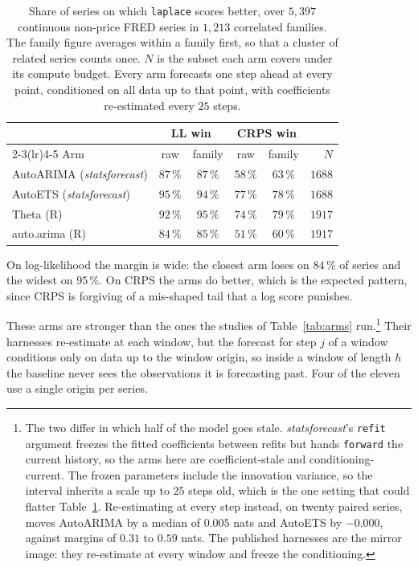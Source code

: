 \documentclass[article]{jss}
\providecommand{\proglang}[1]{\textsf{#1}}
\providecommand{\pkg}[1]{\textit{#1}}
\renewcommand{\pkg}[1]{\textit{#1}}
\providecommand{\code}[1]{\texttt{#1}}
\begin{document}
\begin{table}[t!]
\centering
\begin{tabular}{lccccr}
\toprule
 & \multicolumn{2}{c}{LL win} & \multicolumn{2}{c}{CRPS win} & \\
\cmidrule(lr){2-3}\cmidrule(lr){4-5}
Arm & raw & family & raw & family & $N$ \\
\midrule
AutoARIMA (\pkg{statsforecast}) & $87\,\%$ & $87\,\%$ & $58\,\%$ & $63\,\%$ & $1688$ \\
AutoETS (\pkg{statsforecast})   & $95\,\%$ & $94\,\%$ & $77\,\%$ & $78\,\%$ & $1688$ \\
Theta (\proglang{R})            & $92\,\%$ & $95\,\%$ & $74\,\%$ & $79\,\%$ & $1917$ \\
auto.arima (\proglang{R})       & $84\,\%$ & $85\,\%$ & $51\,\%$ & $60\,\%$ & $1917$ \\
\bottomrule
\end{tabular}
\caption{Share of series on which \code{laplace} scores better, over $5{,}397$
continuous non-price \proglang{FRED} series in $1{,}213$ correlated families.
The family figure averages within a family first, so that a cluster of related
series counts once. $N$ is the subset each arm covers under its compute budget.
Every arm forecasts one step ahead at every point, conditioned on all data up to
that point, with coefficients re-estimated every $25$ steps.}
\label{tab:classic}
\end{table}

On log-likelihood the margin is wide: the closest arm loses on $84\,\%$ of
series and the widest on $95\,\%$. On CRPS the arms do better, which is the
expected pattern, since CRPS is forgiving of a mis-shaped tail that a log score
punishes.

These arms are stronger than the ones the studies of Table~\ref{tab:arms}
run.\footnote{The two differ in which half of the model goes stale.
\pkg{statsforecast}'s \code{refit} argument freezes the fitted coefficients
between refits but hands \code{forward} the current history, so the arms here
are coefficient-stale and conditioning-current. The frozen parameters include
the innovation variance, so the interval inherits a scale up to $25$ steps old,
which is the one setting that could flatter Table~\ref{tab:classic}.
Re-estimating at every step instead, on twenty paired series, moves AutoARIMA by
a median of $0.005$ nats and AutoETS by $-0.000$, against margins of $0.31$ to
$0.59$ nats. The published harnesses are the mirror image: they re-estimate at
every window and freeze the conditioning.} Their harnesses re-estimate at each
window, but the forecast for step $j$ of a window conditions only on data up to
the window origin, so inside a window of length $h$ the baseline never sees the
observations it is forecasting past. Four of the eleven use a single origin per
series.
\end{document}
